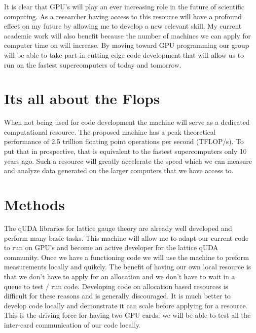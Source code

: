 \documentclass[11pt]{article}
\begin{document}
  It is clear that GPU's will play an ever increasing role in the future of scientific computing.
  As a researcher having access to this resource will have a profound effect on my future by allowing me to develop a new relevant skill.
  My current academic work will also benefit because the number of machines we can apply for computer time on will increase.
  By moving toward GPU programming our group will be able to take part in cutting edge code development that will allow us to run on the fastest supercomputers of today and tomorrow.

  \section*{Its all about the Flops} %
  When not being used for code development the machine will serve as a dedicated computational resource.  
  The proposed machine has a peak theoretical performance of 2.5 trillion floating point operations per second (TFLOP/s).
  To put that in prospective, that is equivalent to the fastest supercomputers only 10 years ago.
  Such a resource will greatly accelerate the speed which we can measure and analyze data generated on the larger computers that we have access to.

  \section*{Methods} %
  The qUDA libraries for lattice gauge theory are already well developed and perform many basic tasks.
  This machine will allow me to adapt our current code to run on GPU's and become an active developer for the lattice qUDA community.
  Once we have a functioning code we will use the machine to preform measurements locally and quikcly.
  The benefit of having our own local resource is that we don't have to apply for an allocation and we don't have to wait in a queue to test / run code.
  Developing code on allocation based resources is difficult for these reasons and is generally discouraged.
  It is much better to develop code locally and demonstrate it can scale before applying for a resource.
  This is the driving force for having two GPU cards; we will be able to test all the inter-card communication of our code locally.
  
\end{document}
